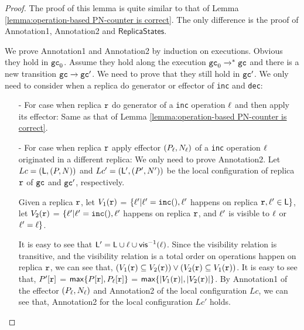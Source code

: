 \begin {proof}

The proof of this lemma is quite similar to that of Lemma \ref{lemma:operation-based PN-counter is correct}. The only difference is the proof of Annotation1, Annotation2 and $\mathsf{ReplicaStates}$.




We prove Annotation1 and Annotation2 by induction on executions. Obvious they hold in $\aglobalstate_0$. Assume they hold along the execution $\aglobalstate_0 \xrightarrow{}^* \aglobalstate$ and there is a new transition $\aglobalstate \xrightarrow{} \aglobalstate'$. We need to prove that they still hold in $\aglobalstate'$. We only need to consider when a replica do generator or effector of {\tt inc} and {\tt dec}:

\begin{itemize}
\setlength{\itemsep}{0.5pt}
\item[-] For case when replica $\arep$ do generator of a {\tt inc} operation $\alabel$ and then apply its effector: Same as that of Lemma \ref{lemma:operation-based PN-counter is correct}.

\item[-] For case when replica $\arep$ apply effector $(P_{\alabel},N_{\alabel})$ of a {\tt inc} operation $\alabel$ originated in a different replica: We only need to prove Annotation2. %
    Let $Lc = (\alabelset,(P,N))$ and $Lc' = (\alabelset',(P',N'))$ be the local configuration of replica $\arep$ of $\aglobalstate$ and $\aglobalstate'$, respectively.

    Given a replica $\arep$, let $V_1(\arep)$ =  $\{ \alabel' \vert \alabel' = \alabelshort[{\tt inc}]{}, \alabel'$ happens on replica $\arep, \alabel' \in \alabelset \}$, let $V_2(\arep)$ =  $\{ \alabel' \vert \alabel' = \alabelshort[{\tt inc}]{}, \alabel'$ happens on replica $\arep$, and $\alabel'$ is visible to $\alabel$ or $\alabel' = \alabel\}$.

    It is easy to see that $\alabelset' = \alabelset \cup \alabel \cup \avisord^{-1}(\alabel)$. Since the visibility relation is transitive, and the visibility relation is a total order on operations happen on replica $\arep$, we can see that, $( V_1(\arep) \subseteq V_2(\arep) ) \vee ( V_2(\arep) \subseteq V_1(\arep) )$. It is easy to see that, $P'[\arep]$ = $\mathsf{max}\{ P[\arep], P_{\alabel}[\arep] \}$ = $\mathsf{max}\{ \vert V_1(\arep) \vert ,\vert V_2(\arep) \vert \}$. By Annotation1 of the effector $(P_{\alabel},N_{\alabel})$ and Annotation2 of the local configuration $Lc$, we can see that, Annotation2 for the local configuration $Lc'$ holds.


\end{itemize}
\end{proof}
